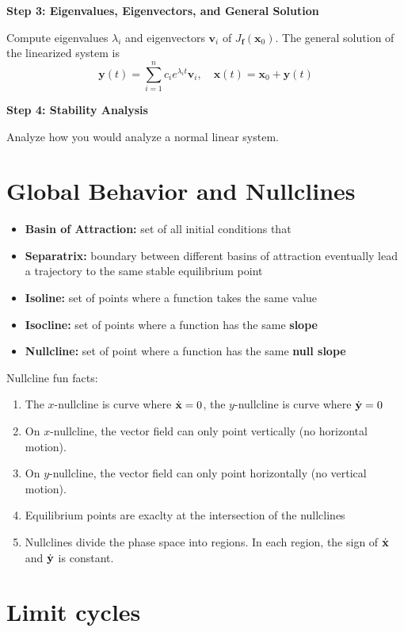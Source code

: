 \documentclass{report}
\begin{document}
\textbf{Step 3: Eigenvalues, Eigenvectors, and General Solution}

Compute eigenvalues $\lambda_i$ and eigenvectors $\mathbf{v}_i$ of $J_{\mathbf{f}}(\mathbf{x}_0)$.  
The general solution of the linearized system is
\[
\mathbf{y}(t) = \sum_{i=1}^n c_i e^{\lambda_i t} \mathbf{v}_i, \quad
\mathbf{x}(t) = \mathbf{x}_0 + \mathbf{y}(t)
\]

\textbf{Step 4: Stability Analysis}

Analyze how you would analyze a normal linear system.

\section*{Global Behavior and Nullclines}

\begin{itemize}
  \item \textbf{Basin of Attraction:} set of all initial conditions that 
  \item \textbf{Separatrix:} boundary between different basins of attraction 
  eventually lead a trajectory to the same stable equilibrium point 
  \item \textbf{Isoline:} set of points where a function takes the same value 
  \item \textbf{Isocline:} set of points where a function has the same \textbf{slope}
  \item \textbf{Nullcline:} set of point where a function has the same \textbf{null slope}
\end{itemize}

Nullcline fun facts:
\begin{enumerate}
  \item The $x$-nullcline is curve where $\dot{\mathbf{x}} = 0$, the $y$-nullcline is curve where $\dot{\mathbf{y}} = 0$
  \item On $x$-nullcline, the vector field can only point vertically (no horizontal motion).
  \item On $y$-nullcline, the vector field can only point horizontally (no vertical motion).
  \item Equilibrium points are exaclty at the intersection of the nullclines
  \item Nullclines divide the phase space into regions. In each region, the 
  sign of $\dot{\mathbf{x}}$ and $\dot{\mathbf{y}}$ is constant.

\end{enumerate}

\section*{Limit cycles}
\end{document}
